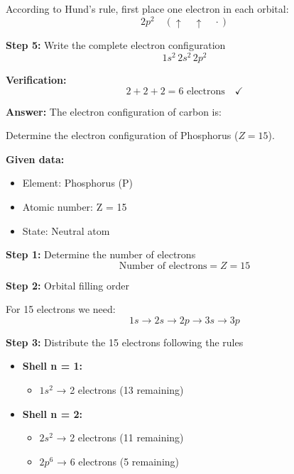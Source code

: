 \begin{exercise}
\begin{solu}
\begin{itemize}
            According to Hund's rule, first place one electron in each orbital:
            \[
                2p^2 \quad (\uparrow \quad \uparrow \quad \cdot)
            \]
        \end{itemize}

        \textbf{Step 5:} Write the complete electron configuration
        \[
            \boxed{1s^2 \, 2s^2 \, 2p^2}
        \]

        \textbf{Verification:}
        \[
            2 + 2 + 2 = 6 \text{ electrons} \quad \checkmark
        \]

        \textbf{Answer:} The electron configuration of carbon is: 
    \end{solu}
\end{exercise}
\begin{exercise}
    Determine the electron configuration of Phosphorus (\( Z = 15 \)).
    \begin{solu}
        \textbf{Given data:}
        \begin{itemize}
            \item Element: Phosphorus (P)
            \item Atomic number: Z = 15
            \item State: Neutral atom
        \end{itemize}

        \textbf{Step 1:} Determine the number of electrons
        \[
            \text{Number of electrons} = Z = 15
        \]

        \textbf{Step 2:} Orbital filling order

        For 15 electrons we need:
        \[
            1s \rightarrow 2s \rightarrow 2p \rightarrow 3s \rightarrow 3p
        \]

        \textbf{Step 3:} Distribute the 15 electrons following the rules

        \begin{itemize}
            \item \textbf{Shell n = 1:}
            \begin{itemize}
                \item \(1s^2\) → 2 electrons (13 remaining)
            \end{itemize}

            \item \textbf{Shell n = 2:}
            \begin{itemize}
                \item \(2s^2\) → 2 electrons (11 remaining)
                \item \(2p^6\) → 6 electrons (5 remaining)
            \end{itemize}


\end{itemize}
\end{solu}
\end{exercise}
